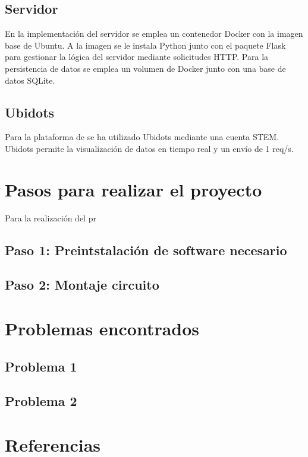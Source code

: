 \documentclass{article}
\begin{document}
\subsection{Servidor}
En la implementación del servidor se emplea un contenedor Docker con la imagen base de Ubuntu. A la imagen se le instala Python junto con el paquete Flask para gestionar la lógica del servidor mediante solicitudes HTTP. Para la persistencia de datos se emplea un volumen de Docker junto con una base de datos SQLite.


\subsection{Ubidots}
Para la plataforma de se ha utilizado Ubidots mediante una cuenta STEM. Ubidots permite la visualización de datos en tiempo real y un envío de 1 req/s.

\section{Pasos para realizar el proyecto}
Para la realización del pr
\subsection{Paso 1: Preintstalación de software necesario}

\subsection{Paso 2: Montaje circuito}
\section{Problemas encontrados}
\subsection{Problema 1} 
\subsection{Problema 2}
\section{Referencias}
\end{document}
